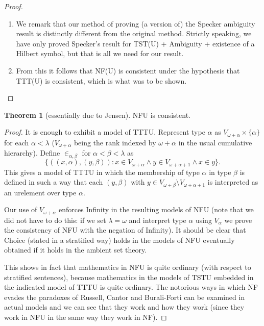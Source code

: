 \documentclass{article}
\theoremstyle{definition}
\newtheorem{theorem}{Theorem}[section]
\theoremstyle{remark}
\begin{document}
{\begin{proof}
\begin{enumerate}
\item  We remark that our method of proving (a version of) the Specker ambiguity result is distinctly different from the original method.  Strictly speaking, we have only proved Specker's result for TST(U) + Ambiguity + existence of a Hilbert symbol, but that is all we need for our result.

\item From this it follows that NF(U) is consistent under the hypothesis that TTT(U) is consistent, which is what was to be shown.

\end{enumerate}
\end{proof}

\begin{theorem}[essentially due to Jensen]
  NFU is consistent.
\end{theorem}
\begin{proof}
It is enough to exhibit a model of TTTU.  Represent type $\alpha$ as $V_{\omega+\alpha} \times \{\alpha\}$ for each $\alpha<\lambda$ ($V_{\omega+\alpha}$ being the rank indexed by $\omega+\alpha$ in the usual cumulative hierarchy).  Define $\in_{\alpha,\beta}$ for
$\alpha<\beta<\lambda$ as $$\{((x,\alpha),(y,\beta)):x \in V_{\omega+\alpha} \wedge y \in V_{\omega+\alpha+1} \wedge x \in y\}.$$  This gives a model of TTTU in which the membership of
type $\alpha$ in type $\beta$ is defined in such a way that each $(y,\beta)$ with $y \in V_{\omega+\beta} \setminus V_{\omega+\alpha+1}$ is interpreted as an urelement over type $\alpha$.

Our use of $V_{\omega+\alpha}$ enforces Infinity in the resulting models of NFU (note that we did not have to do this:  if we set $\lambda=\omega$ and interpret type $\alpha$ using $V_\alpha$ we prove the consistency of NFU with the negation of Infinity).  It should be clear that Choice (stated in a stratified way) holds in the models of NFU eventually obtained if it holds in the ambient set theory.

This shows in fact that mathematics in NFU is quite ordinary (with respect to stratified sentences), because mathematics in the models of TSTU embedded in the indicated model of TTTU is quite ordinary.  The notorious ways in which NF evades the paradoxes of Russell, Cantor and Burali-Forti can be examined in actual models and we can see that they work and how they work (since they work in NFU in the same way they work in NF).
\end{proof}

}
\end{document}
